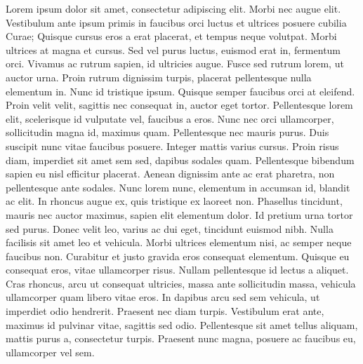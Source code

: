 \documentclass[twoside]{article}
\begin{document}
\beginnumbering
\pstart
\autoversenumber Lorem ipsum dolor sit amet, consectetur adipiscing elit.
\autoversenumber Morbi nec augue elit.
\autoversenumber Vestibulum ante ipsum primis in faucibus orci luctus et ultrices posuere cubilia Curae; Quisque cursus eros a erat placerat, et tempus neque volutpat.
\autoversenumber Morbi ultrices at magna et cursus.
\autoversenumber Sed vel purus luctus, euismod erat in, fermentum orci.
\autoversenumber Vivamus ac rutrum sapien, id ultricies augue.
\autoversenumber Fusce sed rutrum lorem, ut auctor urna.
\autoversenumber Proin rutrum dignissim turpis, placerat pellentesque nulla elementum in.
\autoversenumber Nunc id tristique ipsum.
\autoversenumber Quisque semper faucibus orci at eleifend.
\autoversenumber Proin velit velit, sagittis nec consequat in, auctor eget tortor.
\autoversenumber Pellentesque lorem elit, scelerisque id vulputate vel, faucibus a eros.
\autoversenumber Nunc nec orci ullamcorper, sollicitudin magna id, maximus quam.
\autoversenumber Pellentesque nec mauris purus.
\autoversenumber Duis suscipit nunc vitae faucibus posuere.
\autoversenumber Integer mattis varius cursus.
\autoversenumber Proin risus diam, imperdiet sit amet sem sed, dapibus sodales quam.
\autoversenumber Pellentesque bibendum sapien eu nisl efficitur placerat.
\autoversenumber Aenean dignissim ante ac erat pharetra, non pellentesque ante sodales.
\autoversenumber Nunc lorem nunc, elementum in accumsan id, blandit ac elit.
\autoversenumber In rhoncus augue ex, quis tristique ex laoreet non.
\autoversenumber Phasellus tincidunt, mauris nec auctor maximus, sapien elit elementum dolor.
\autoversenumber Id pretium urna tortor sed purus.
\autoversenumber Donec velit leo, varius ac dui eget, tincidunt euismod nibh.
\autoversenumber Nulla facilisis sit amet leo et vehicula.
\autoversenumber Morbi ultrices elementum nisi, ac semper neque faucibus non.
\autoversenumber Curabitur et justo gravida eros consequat elementum.
\autoversenumber Quisque eu consequat eros, vitae ullamcorper risus.
\autoversenumber Nullam pellentesque id lectus a aliquet.
\autoversenumber Cras rhoncus, arcu ut consequat ultricies, massa ante sollicitudin massa, vehicula ullamcorper quam libero vitae eros.
\autoversenumber In dapibus arcu sed sem vehicula, ut imperdiet odio hendrerit.
\autoversenumber Praesent nec diam turpis.
\autoversenumber Vestibulum erat ante, maximus id pulvinar vitae, sagittis sed odio.
\autoversenumber Pellentesque sit amet tellus aliquam, mattis purus a, consectetur turpis.
\autoversenumber Praesent nunc magna, posuere ac faucibus eu, ullamcorper vel sem.
\end{document}
